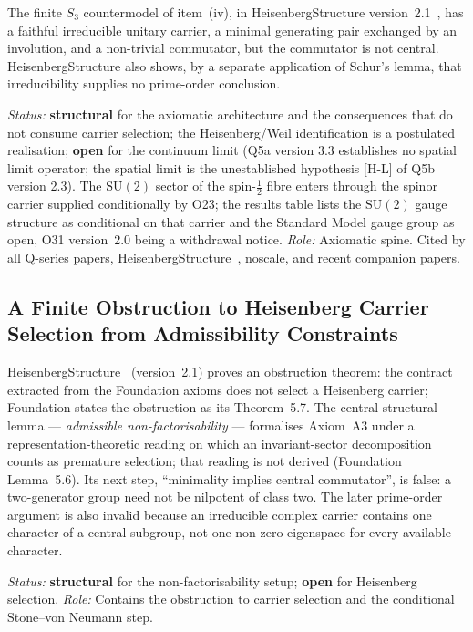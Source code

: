 \documentclass[11pt,a4paper]{article}
\newcommand{\SU}{\mathrm{SU}}
\newcommand{\sstruct}{\textcolor{cstruct}{\textbf{structural}}}
\newcommand{\sopen}{\textcolor{copen}{\textbf{open}}}
\begin{document}
    The finite \(S_3\) countermodel of item~(iv), in HeisenbergStructure
    version~2.1~\cite{Beau2026HeisenbergStructure}, has a faithful irreducible unitary carrier, a minimal
    generating pair exchanged by an involution, and a non-trivial commutator, but the commutator is not central.
    HeisenbergStructure also shows, by a separate application of Schur's lemma, that irreducibility
    supplies no prime-order conclusion.

    \textit{Status:} \sstruct{} for the axiomatic architecture and the consequences that do not consume
    carrier selection; the Heisenberg/Weil identification is a postulated realisation;
    \sopen{} for the continuum limit (Q5a version 3.3 establishes no spatial limit operator; the
    spatial limit is the unestablished hypothesis [H-L] of Q5b version 2.3).
    The $\SU(2)$ sector of the spin-$\tfrac12$ fibre enters through the spinor carrier supplied
    conditionally by O23; the results table lists the $\SU(2)$ gauge structure as conditional on that carrier and the
    Standard Model gauge group as open, O31 version~2.0 being a withdrawal notice.
    \textit{Role:} Axiomatic spine.
    Cited by all Q-series papers, HeisenbergStructure~\cite{Beau2026HeisenbergStructure}, noscale, and recent
    companion papers.

  \subsection{A Finite Obstruction to Heisenberg Carrier Selection from Admissibility Constraints}

    HeisenbergStructure~\cite{Beau2026HeisenbergStructure} (version~2.1) proves an obstruction theorem: the
    contract extracted from the Foundation axioms does not select a Heisenberg carrier;
    Foundation states the obstruction as its Theorem~5.7.
    The central structural lemma --- \emph{admissible non-factorisability} --- formalises Axiom~A3 under a
    representation-theoretic reading on which an invariant-sector decomposition counts as premature selection;
    that reading is not derived (Foundation Lemma~5.6).
    Its next step, ``minimality implies central commutator'', is false: a two-generator group need not be
    nilpotent of class two.
    The later prime-order argument is also invalid because an irreducible complex carrier contains one
    character of a central subgroup, not one non-zero eigenspace for every available character.

    \textit{Status:} \sstruct{} for the non-factorisability setup; \sopen{} for Heisenberg selection.
    \textit{Role:} Contains the obstruction to carrier selection and the conditional
    Stone--von Neumann step.
\end{document}
